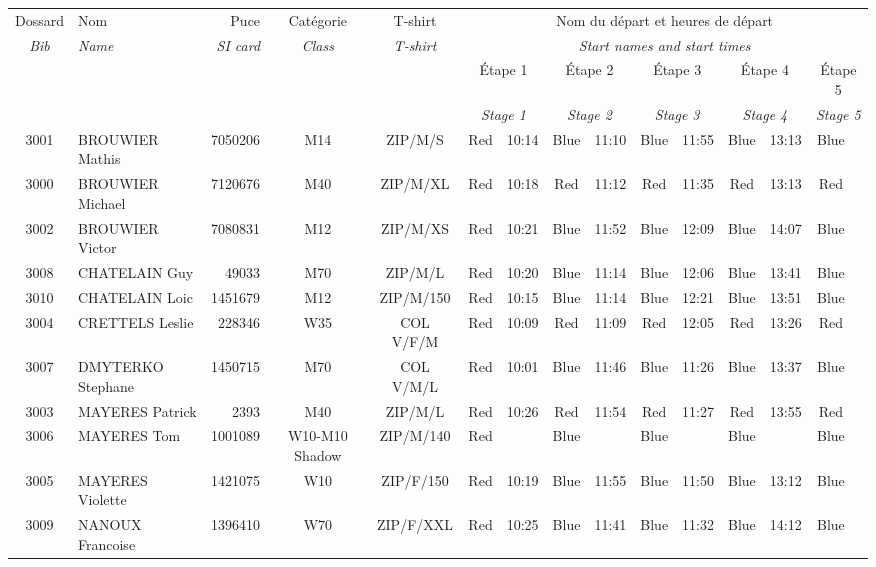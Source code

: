 \documentclass{report}
\begin{document}
  \begin{longtable}{|c|l|r|c|c|*{5}{cc|}}
    Dossard & Nom  & Puce    & Catégorie & T-shirt & \multicolumn{10}{c|}{Nom du départ et heures de départ} \\
    \itshape Bib     & \itshape Name & \itshape SI card & \itshape Class  & \itshape  T-shirt  & \multicolumn{10}{c|}{\itshape Start names and start times} \\
    \hline
    & & & & & \multicolumn{2}{c|}{Étape 1} & \multicolumn{2}{c|}{Étape 2} & \multicolumn{2}{c|}{Étape 3} & \multicolumn{2}{c|}{Étape 4} & \multicolumn{2}{c|}{Étape 5} \\
    & & & & & \multicolumn{2}{c|}{\itshape Stage 1} & \multicolumn{2}{c|}{\itshape Stage 2} & \multicolumn{2}{c|}{\itshape Stage 3} & \multicolumn{2}{c|}{\itshape Stage 4} & \multicolumn{2}{c|}{\itshape Stage 5} \\
    \hline
    3001 & BROUWIER Mathis & 7050206 & M14 & ZIP/M/S & Red & 10:14 & Blue & 11:10 & Blue & 11:55 & Blue & 13:13 & Blue &  \\
    3000 & BROUWIER Michael & 7120676 & M40 & ZIP/M/XL & Red & 10:18 & Red & 11:12 & Red & 11:35 & Red & 13:13 & Red &  \\
    3002 & BROUWIER Victor & 7080831 & M12 & ZIP/M/XS & Red & 10:21 & Blue & 11:52 & Blue & 12:09 & Blue & 14:07 & Blue &  \\
    3008 & CHATELAIN Guy & 49033 & M70 & ZIP/M/L & Red & 10:20 & Blue & 11:14 & Blue & 12:06 & Blue & 13:41 & Blue &  \\
    3010 & CHATELAIN Loic & 1451679 & M12 & ZIP/M/150 & Red & 10:15 & Blue & 11:14 & Blue & 12:21 & Blue & 13:51 & Blue &  \\
    3004 & CRETTELS Leslie & 228346 & W35 & COL V/F/M & Red & 10:09 & Red & 11:09 & Red & 12:05 & Red & 13:26 & Red &  \\
    3007 & DMYTERKO Stephane & 1450715 & M70 & COL V/M/L & Red & 10:01 & Blue & 11:46 & Blue & 11:26 & Blue & 13:37 & Blue &  \\
    3003 & MAYERES Patrick & 2393 & M40 & ZIP/M/L & Red & 10:26 & Red & 11:54 & Red & 11:27 & Red & 13:55 & Red &  \\
    3006 & MAYERES Tom & 1001089 & W10-M10 Shadow & ZIP/M/140 & Red &   & Blue &   & Blue &   & Blue &   & Blue &  \\
    3005 & MAYERES Violette & 1421075 & W10 & ZIP/F/150 & Red & 10:19 & Blue & 11:55 & Blue & 11:50 & Blue & 13:12 & Blue &  \\
    3009 & NANOUX Francoise & 1396410 & W70 & ZIP/F/XXL & Red & 10:25 & Blue & 11:41 & Blue & 11:32 & Blue & 14:12 & Blue &  \\
  \end{longtable}
\end{document}
